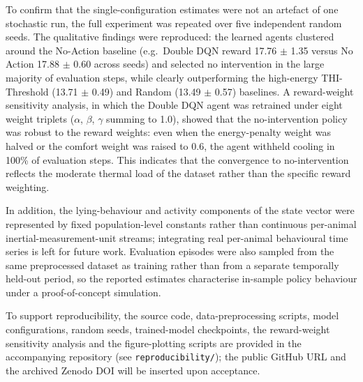 To confirm that the single-configuration estimates were not an artefact of one
stochastic run, the full experiment was repeated over five independent random
seeds. The qualitative findings were reproduced: the learned agents clustered
around the No-Action baseline (e.g.\ Double DQN reward 17.76 $\pm$ 1.35 versus
No Action 17.88 $\pm$ 0.60 across seeds) and selected no intervention in the
large majority of evaluation steps, while clearly outperforming the high-energy
THI-Threshold (13.71 $\pm$ 0.49) and Random (13.49 $\pm$ 0.57) baselines. A
reward-weight sensitivity analysis, in which the Double DQN agent was retrained
under eight weight triplets ($\alpha$, $\beta$, $\gamma$ summing to 1.0), showed
that the no-intervention policy was robust to the reward weights: even when the
energy-penalty weight was halved or the comfort weight was raised to 0.6, the
agent withheld cooling in 100\% of evaluation steps. This indicates that the
convergence to no-intervention reflects the moderate thermal load of the
dataset rather than the specific reward weighting.


In addition, the lying-behaviour and activity components of the state vector
were represented by fixed population-level constants rather than continuous
per-animal inertial-measurement-unit streams; integrating real per-animal
behavioural time series is left for future work. Evaluation episodes were also
sampled from the same preprocessed dataset as training rather than from a
separate temporally held-out period, so the reported estimates characterise
in-sample policy behaviour under a proof-of-concept simulation.


To support reproducibility, the source code, data-preprocessing scripts, model
configurations, random seeds, trained-model checkpoints, the reward-weight
sensitivity analysis and the figure-plotting scripts are provided in the
accompanying repository (see \texttt{reproducibility/}); the public GitHub URL
and the archived Zenodo DOI will be inserted upon acceptance.
